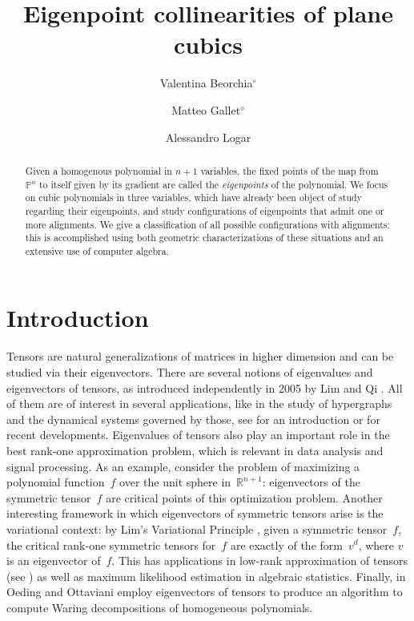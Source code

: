 \documentclass{amsart}
\title{Eigenpoint collinearities of plane cubics}
\author[Valentina Beorchia]{Valentina Beorchia$^{\circ}$}
\author[Matteo Gallet]{Matteo Gallet$^{\diamond}$}
\author[Alessandro Logar]{Alessandro Logar}
\date{}
\theoremstyle{plain}
\theoremstyle{definition}
\newcommand{\R}{\mathbb{R}}
\newcommand{\p}{\mathbb{P}}
\begin{document}
\begin{abstract}
 Given a homogenous polynomial in $n+1$ variables, the fixed points of the map from $\p^n$ to itself given by its gradient are called the \emph{eigenpoints} of the polynomial. We focus on cubic polynomials in three variables, which have already been object of study regarding their eigenpoints, and study configurations of eigenpoints that admit one or more alignments. We give a classification of all possible configurations with alignments: this is accomplished using both geometric characterizations of these situations and an extensive use of computer algebra.
\end{abstract}

\maketitle


\section{Introduction}
\label{introduction}

Tensors are natural generalizations of matrices in higher dimension and can be studied via their eigenvectors. There are several notions of eigenvalues and eigenvectors of tensors, as introduced independently in 2005 by Lim \cite{Lim} and Qi \cite{Qi}. All of them are of interest in several applications, like in the study of hypergraphs and the dynamical systems governed by those, see \cite[Section 4]{QZ} for an introduction or \cite{GMV} for recent developments. Eigenvalues of tensors also play an important role in the best rank-one approximation problem, which is relevant in data analysis and signal processing.
As an example, consider the problem of maximizing a polynomial function~$f$ over the unit sphere in~$\R^{n+1}$: eigenvectors of the symmetric tensor~$f$ are critical points of this optimization problem. Another interesting framework in which eigenvectors of symmetric tensors arise is the variational context: by Lim's Variational Principle \cite{Lim}, given a symmetric tensor~$f$, the critical rank-one symmetric tensors for~$f$ are exactly of the form~$v^d$, where $v$ is an eigenvector of~$f$.
This has applications in low-rank approximation of tensors (see \cite{OttSod}) as well as maximum likelihood estimation in algebraic statistics. Finally, in \cite{OO} Oeding and Ottaviani employ eigenvectors of tensors to produce an algorithm to compute Waring decompositions of homogeneous polynomials.
\end{document}
